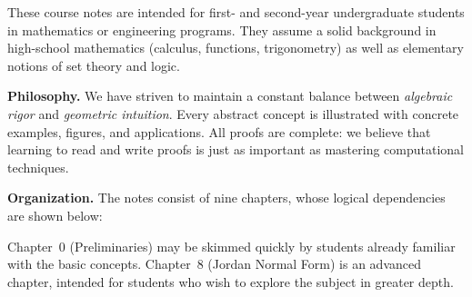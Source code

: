 \documentclass[a4paper,11pt,twoside,openright]{book}
\begin{document}
These course notes are intended for first- and second-year undergraduate students in mathematics or engineering programs. They assume a solid background in high-school mathematics (calculus, functions, trigonometry) as well as elementary notions of set theory and logic.

\medskip

\noindent\textbf{Philosophy.}
We have striven to maintain a constant balance between \emph{algebraic rigor} and \emph{geometric intuition}. Every abstract concept is illustrated with concrete examples, figures, and applications. All proofs are complete: we believe that learning to read and write proofs is just as important as mastering computational techniques.

\medskip

\noindent\textbf{Organization.}
The notes consist of nine chapters, whose logical dependencies are shown below:

\begin{center}
\end{center}

Chapter~0 (Preliminaries) may be skimmed quickly by students already familiar with the basic concepts. Chapter~8 (Jordan Normal Form) is an advanced chapter, intended for students who wish to explore the subject in greater depth.
\end{document}

